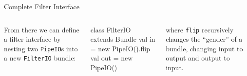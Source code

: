 \documentclass[xcolor=pdflatex,dvipsnames,table]{beamer}
\begin{document}
\begin{frame}[fragile]{Complete Filter Interface}

\begin{columns}

From there we can define a filter interface by nesting two
\verb+PipeIO+s into a new \verb+FilterIO+ bundle:

\begin{scala}
class FilterIO extends Bundle { 
  val in  = new PipeIO().flip
  val out = new PipeIO()
}
\end{scala}

\noindent
where \verb+flip+ recursively changes the ``gender'' of a bundle,
changing input to output and output to input.



\end{columns}
\end{frame}
\end{document}

